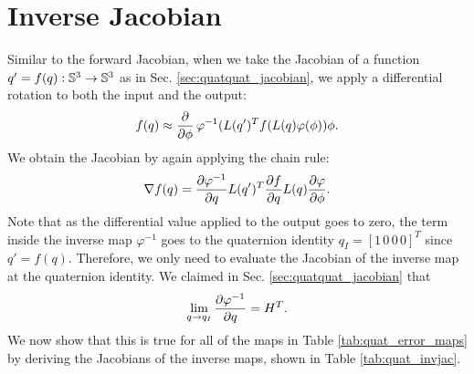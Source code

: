 \documentclass[../root.tex]{subfiles}
\begin{document}
\section{Inverse Jacobian}
Similar to the forward Jacobian, when we take the Jacobian of a 
function $q' = f(q) : \mathbb{S}^3 \rightarrow \mathbb{S}^3$ as in Sec. \ref{sec:quatquat_jacobian}, we 
apply a differential rotation to both the input and the output:
\begin{equation}
    f(q) \approx \pdv{}{\phi} \, \varphi^{-1}(L(q')^T f( L(q) \varphi(\phi)) \phi.
\end{equation}
We obtain the Jacobian by again applying the chain rule:
\begin{equation}
    \nabla f(q) = \pdv{\varphi^{-1}}{q} L(q')^T \pdv{f}{q} L(q) \pdv{\varphi}{\phi}.
\end{equation}
Note that as the differential value applied to the output goes to zero, the
term inside the inverse map $\varphi^{-1}$ goes to the quaternion identity 
$q_I = [1 \, 0 \, 0 \, 0]^T$ since $q' = f(q)$. Therefore, we only need to 
evaluate the Jacobian of the inverse map at the quaternion identity. We claimed
in Sec. \ref{sec:quatquat_jacobian} that 
\begin{equation} \label{eq:quat_inv_identity}
    \lim_{q \rightarrow q_I} \pdv{\varphi^{-1}}{q} = H^T.
\end{equation}
We now show that this is true for all of the maps in Table \ref{tab:quat_error_maps}
by deriving the Jacobians of the inverse maps, shown in Table \ref{tab:quat_invjac}.
\end{document}
